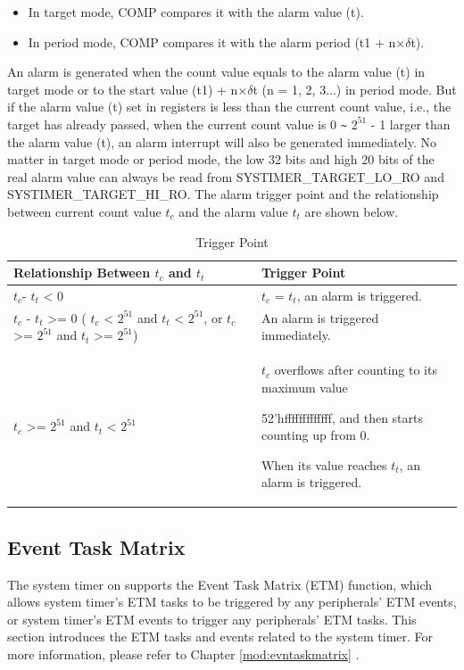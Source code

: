 \documentclass[main\_\_EN.tex]{subfiles}
\begin{document}
\begin{itemize}
        \item In target mode, COMP compares it with the alarm value (t).
        \item In period mode, COMP compares it with the alarm period (t1 + n×$\delta$t).
\end{itemize}

An alarm is generated when the count value equals to the alarm value (t) in target mode or to the start value (t1) + n×$\delta$t (n = 1, 2, 3...) in period mode. But if the alarm value (t) set in registers is less than the current count value, i.e., the target has already passed, when the current count value is 0 \verb+~+ $2^{51}$ - 1 larger than the alarm value (t), an alarm interrupt will also be generated immediately. No matter in target mode or period mode, the low 32 bits and high 20 bits of the real alarm value can always be read from SYSTIMER\_TARGET\_LO\_RO and  SYSTIMER\_TARGET\_HI\_RO. The alarm trigger point and the relationship between current count value $t_{c}$ and the alarm value $t_{t}$ are shown below.

\begin{longtable}[c]{ | p{5cm} | p{7.5cm} |}
\caption{Trigger Point}\\\hline
\rowcolor{lightgray}
\textbf{Relationship Between $t_{c}$ and $t_{t}$} & \textbf{Trigger Point}\\ \hline
\endhead
$t_{c}$- $t_{t}$ < 0 & $t_{c}$ = $t_{t}$, an alarm is triggered.\\ \hline
$t_{c}$ - $t_{t}$ >= 0 \newline ( $t_{c}$ < $2^{51}$ and $t_{t}$ < $2^{51}$, \newline or $t_{c}$ >= $2^{51}$ and $t_{t}$ >= $2^{51}$) & An alarm is triggered immediately. \\ \hline
\multirow{3}{*}{
$t_{c}$ >= $2^{51}$ and $t_{t}$ < $2^{51}$} &

$t_{c}$ overflows after counting to its maximum value

52'hfffffffffffff, and then starts counting up from 0.

When its value reaches $t_{t}$, an alarm is triggered. \\ \hline
\end{longtable}


\subsection{Event Task Matrix}
The system timer on \chipname{} supports the Event Task Matrix (ETM) function, which allows system timer's ETM tasks to be triggered by any peripherals' ETM events, or system timer's ETM events to trigger any peripherals' ETM tasks. This section introduces the ETM tasks and events related to the system timer. For more information, please refer to Chapter \ref{mod:evntaskmatrix} .
\end{document}
